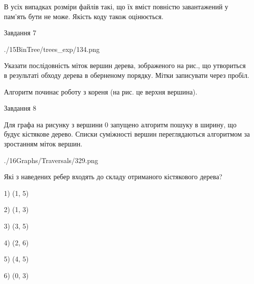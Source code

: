 \documentclass[12pt, ukrainian]{article}
\begin{document}
{В усіх випадках розміри файлів такі, що їх вміст повністю завантажений у пам'ять бути не може. Якість коду також оцінюється.



\vspace{10mm}\par

\newpage
\begin{minipage}[t]{9.7cm}
               
{\begin{center}Завдання {7}\end{center}}
\vspace{-6mm}

\begin{center}
	{./15BinTree/trees_exp/134.png}
\end{center}
Указати послідовність міток вершин дерева, зображеного на рис., що утвориться в результаті обходу дерева в оберненому порядку. Мітки записувати через пробіл.\par Алгоритм починає роботу з кореня (на рис. це верхня вершина).\par

\end{minipage}
\vline \hspace{8mm}
\begin{minipage}[t]{8.0cm}
               
{\begin{center}Завдання {8}\end{center}}
\vspace{-6mm}
Для графа на рисунку з вершини 0 запущено алгоритм пошуку в ширину, що будує кістякове дерево. Списки суміжності вершин переглядаються алгоритмом за зростанням міток вершин.\par
\begin{center}
	{./16Graphs/Traversals/329.png}
\end{center}
\par Які з наведених ребер входять до складу отриманого кістякового дерева?\par
1) (1, 5)\par
2) (1, 3)\par
3) (3, 5)\par
4) (2, 6)\par
5) (4, 5)\par
6) (0, 3)\par
{\vskip 15pt} \par


\end{minipage}}
\end{document}
